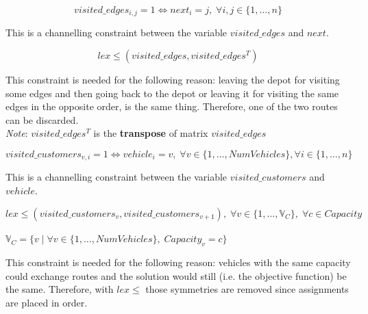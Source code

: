 \documentclass[../main.tex]{subfiles}
\begin{document}
\begin{center}
    \begin{equation}
        visited\_edges_{i,j} = 1 \Leftrightarrow next_i = j, \; \forall i,j \in \{1,\dots,n\}
    \end{equation}
\end{center}
This is a channelling constraint between the variable $visited\_edges$ and $next$.

\begin{center} %
    \begin{equation}
        lex\leq(visited\_edges, visited\_edges^T)
    \end{equation}
\end{center}
This constraint is needed for the following reason: leaving the depot for visiting some edges and then going back to the depot or leaving it for visiting the same edges in the opposite order, is the same thing. Therefore, one of the two routes can be discarded.\\
\textit{Note}: $ visited\_edges^T$ is the \textbf{transpose} of matrix $visited\_edges$

\begin{center}
    \begin{equation}
        visited\_customers_{v,i} = 1 \Leftrightarrow vehicle_i = v, \; \forall v \in \{1,\dots,NumVehicles\}, \forall i \in \{1,\dots,n\}
    \end{equation}
\end{center}
This is a channelling constraint between the variable $visited\_customers$ and $vehicle$.

\begin{center}
    \begin{equation}
        lex\leq(visited\_customers_{v}, visited\_customers_{v+1}), \; \forall v \in \{1,\dots,\mathbb{V}_{C}\}, \; \forall c \in Capacity
    \end{equation}\\
    \begin{math}
        \mathbb{V}_{C} = \{v \; | \; \forall v \in \{1,\dots,NumVehicles\}, \; Capacity_v = c\}
    \end{math}
\end{center}
This constraint is needed for the following reason: vehicles with the same capacity could exchange routes and the solution would still (i.e. the objective function) be the same. Therefore, with $lex\leq$ those symmetries are removed since assignments are placed in order.
\end{document}
